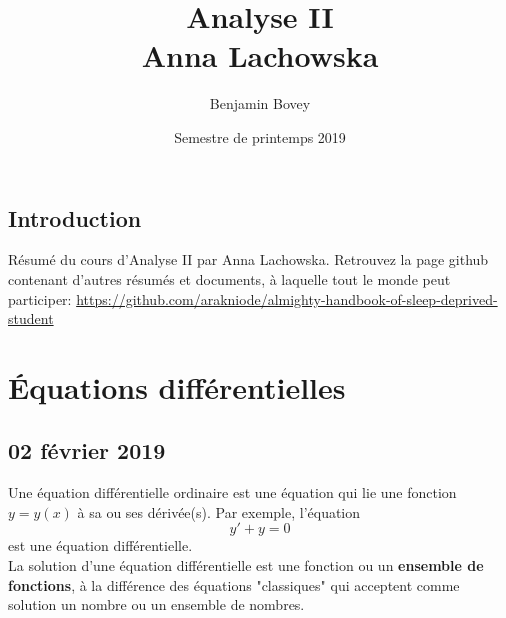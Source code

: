 \documentclass{report}
\title{Analyse II \\ Anna Lachowska}
\author{Benjamin Bovey}
\date{Semestre de printemps 2019}
\theoremstyle{plain}
\theoremstyle{definition}
\theoremstyle{remark}
\begin{document}
\section*{Introduction}
Résumé du cours d'Analyse II par Anna Lachowska. Retrouvez la page github contenant d'autres résumés et documents, à laquelle tout le monde peut participer: \url{https://github.com/arakniode/almighty-handbook-of-sleep-deprived-student}

\chapter{Équations différentielles}

\section{02 février 2019}
Une équation différentielle ordinaire est une équation qui lie une fonction $y = y(x)$ à sa ou ses dérivée(s). Par exemple, l'équation
\begin{equation}
	y' + y = 0
\end{equation}
est une équation différentielle. 
\\
La solution d'une équation différentielle est une fonction ou un \textbf{ensemble de fonctions}, à la différence des équations "classiques" qui acceptent comme solution un nombre ou un ensemble de nombres. 
\end{document}
